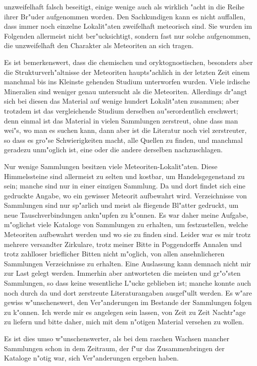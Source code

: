\documentclass[a4paper, 11pt, oneside]{article}
\begin{document}
unzweifelhaft falsch beseitigt, einige wenige auch als wirklich "acht in die Reihe ihrer Br"uder aufgenommen worden. Den Sachkundigen kann es nicht auffallen, dass immer noch einzelne Lokalit"aten zweifelhaft meteorisch sind. Sie wurden im Folgenden allermeist nicht ber"ucksichtigt, sondern fast nur solche aufgenommen, die unzweifelhaft den Charakter als Meteoriten an sich tragen.

Es ist bemerkenswert, dass die chemischen und oryktognostischen, besonders aber die Strukturverh"altnisse der Meteoriten haupts"achlich in der letzten Zeit einem manchmal bis ins Kleinste gehenden Studium unterworfen wurden. Viele irdische Mineralien sind weniger genau untersucht als die Meteoriten. Allerdings dr"angt sich bei diesen das Material auf wenige hundert Lokalit"aten zusammen; aber trotzdem ist das vergleichende Studium derselben au"serordentlich erschwert; denn einmal ist das Material in vielen Sammlungen zerstreut, ohne dass man wei"s, wo man es suchen kann, dann aber ist die Literatur noch viel zerstreuter, so dass es gro"se Schwierigkeiten macht, alle Quellen zu finden, und manchmal geradezu unm"oglich ist, eine oder die andere derselben nachzuschlagen.

Nur wenige Sammlungen besitzen viele Meteoriten-Lokalit"aten. Diese Himmelssteine sind allermeist zu selten und kostbar, um Handelsgegenstand zu sein; manche sind nur in einer einzigen Sammlung. Da und dort findet sich eine gedruckte Angabe, wo ein gewisser Meteorit aufbewahrt wird. Verzeichnisse von Sammlungen sind nur sp"arlich und meist als fliegende Bl"atter gedruckt, um neue Tauschverbindungen ankn"upfen zu k"onnen. Es war daher meine Aufgabe, m"oglichst viele Kataloge von Sammlungen zu erhalten, um festzustellen, welche Meteoriten aufbewahrt werden und wo sie zu finden sind. Leider war es mir trotz mehrere versandter Zirkulare, trotz meiner Bitte in Poggendorffs Annalen und trotz zahlloser brieflicher Bitten nicht m"oglich, von allen ansehnlicheren Sammlungen Verzeichnisse zu erhalten. Eine Auslassung kann demnach nicht mir zur Last gelegt werden. Immerhin aber antworteten die meisten und gr"o"sten Sammlungen, so dass keine wesentliche L"ucke geblieben ist; manche konnte auch noch durch da und dort zerstreute Literaturangaben ausgef"ullt werden. Es w"are gewiss w"unschenswert, den Ver"anderungen im Bestande der Sammlungen folgen zu k"onnen. Ich werde mir es angelegen sein lassen, von Zeit zu Zeit Nachtr"age zu liefern und bitte daher, mich mit dem n"otigen Material versehen zu wollen.

Es ist dies umso w"unschenswerter, als bei dem raschen Wachsen mancher Sammlungen schon in dem Zeitraum, der f"ur das Zusammenbringen der Kataloge n"otig war, sich Ver"anderungen ergeben haben.
\end{document}
